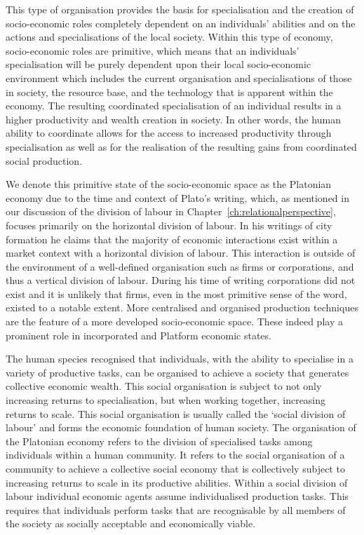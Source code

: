 This type of organisation provides the basis for specialisation and the creation of socio-economic roles completely dependent on an individuals' abilities and on the actions and specialisations of the local society. Within this type of economy, socio-economic roles are primitive, which means that an individuals' specialisation will be purely dependent upon their local socio-economic environment which includes the current organisation and specialisations of those in society, the resource base, and the technology that is apparent within the economy. The resulting coordinated specialisation of an individual results in a higher productivity and wealth creation in society. In other words, the human ability to coordinate allows for the access to increased productivity through specialisation as well as for the realisation of the resulting gains from coordinated social production.

We denote this primitive state of the socio-economic space as the Platonian economy due to the time and context of Plato's writing, which, as mentioned in our discussion of the division of labour in Chapter~\ref{ch:relationalperspective}, focuses primarily on the horizontal division of labour. In his writings of city formation he claims that the majority of economic interactions exist within a market context with a horizontal division of labour. This interaction is outside of the environment of a well-defined organisation such as firms or corporations, and thus a vertical division of labour. During his time of writing corporations did not exist and it is unlikely that firms, even in the most primitive sense of the word, existed to a notable extent. More centralised and organised production techniques are the feature of a more developed socio-economic space. These indeed play a prominent role in incorporated and Platform economic states.

The human species recognised that individuals, with the ability to specialise in a variety of productive tasks, can be organised to achieve a society that generates collective economic wealth. This social organisation is subject to not only increasing returns to specialisation, but when working together, increasing returns to scale. This social organisation is usually called the `social division of labour' and forms the economic foundation of human society. The organisation of the Platonian economy refers to the division of specialised tasks among individuals within a human community. It refers to the social organisation of a community to achieve a collective social economy that is collectively subject to increasing returns to scale in its productive abilities. Within a social division of labour individual economic agents assume individualised production tasks. This requires that individuals perform tasks that are recognisable by all members of the society as socially acceptable and economically viable.

